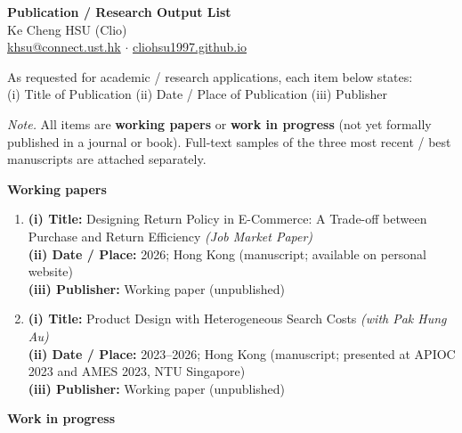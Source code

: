 \documentclass[11pt]{article}
\begin{document}
\begin{center}
{\Large\bfseries Publication / Research Output List}\\[0.35em]
{\large Ke Cheng HSU (Clio)}\\[0.2em]
\href{mailto:khsu@connect.ust.hk}{khsu@connect.ust.hk} $\cdot$
\href{https://cliohsu1997.github.io/}{cliohsu1997.github.io}
\end{center}

\vspace{0.6em}

\noindent
As requested for academic / research applications, each item below states:\\[0.2em]
(i) Title of Publication\quad
(ii) Date / Place of Publication\quad
(iii) Publisher

\vspace{0.35em}
\noindent\textit{Note.} All items are \textbf{working papers} or \textbf{work in progress} (not yet formally published in a journal or book). Full-text samples of the three most recent / best manuscripts are attached separately.

\vspace{0.5em}
{\large\bfseries Working papers}

\begin{enumerate}[leftmargin=*, itemsep=0.85em]
\item
\textbf{(i) Title:} Designing Return Policy in E-Commerce: A Trade-off between Purchase and Return Efficiency \textit{(Job Market Paper)}\\
\textbf{(ii) Date / Place:} 2026; Hong Kong (manuscript; available on personal website)\\
\textbf{(iii) Publisher:} Working paper (unpublished)

\item
\textbf{(i) Title:} Product Design with Heterogeneous Search Costs \textit{(with Pak Hung Au)}\\
\textbf{(ii) Date / Place:} 2023--2026; Hong Kong (manuscript; presented at APIOC 2023 and AMES 2023, NTU Singapore)\\
\textbf{(iii) Publisher:} Working paper (unpublished)
\end{enumerate}

\vspace{0.35em}
{\large\bfseries Work in progress}
\end{document}
